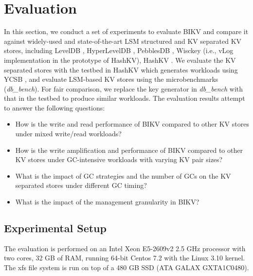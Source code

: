 \documentclass[sigconf]{acmart}
\begin{document}
\section{Evaluation} \label{evaluation}
In this section, we conduct a set of experiments to evaluate BIKV and compare it against widely-used and state-of-the-art LSM structured and KV separated KV stores, including LevelDB \cite{LevelDB}, HyperLevelDB \cite{HyperLevelDB}, PebblesDB \cite{PebblesDB}, Wisckey \cite{Wisckey} (i.e., vLog implementation in the prototype of HashKV), HashKV \cite{HashKV} {}. We evaluate the KV separated stores with the testbed in HashKV which generates workloads using YCSB \cite{YCSB}, and evaluate LSM-based KV stores using the microbenchmarks (\textit{db\_bench}). For fair comparison, we replace the key generator in \textit{db\_bench} with that in the testbed to produce similar workloads. {\color{red}{We also modify the workload generator in KVell to produce the KV pairs under the same distribution with the testbed.}} The evaluation results attempt to answer the following questions:
\begin{itemize}
	\item How is the write and read performance of BIKV compared to other KV stores under mixed write/read workloads?
	\item How is the write amplification and performance of BIKV compared to other KV stores under GC-intensive workloads with varying KV pair sizes?
	\item What is the impact of GC strategies and the number of GCs on the {\color{red}{LSM-indexed}} KV separated stores under different GC timing?  
	\item What is the impact of the management granularity in BIKV?
\end{itemize}

\subsection{Experimental Setup}
The evaluation is performed on an Intel Xeon E5-2609v2 2.5 GHz processor with two cores, 32 GB of RAM, running 64-bit Centos 7.2 with the Linux 3.10 kernel. The xfs file system is run on top of a 480 GB SSD (ATA GALAX GXTA1C0480). 
\end{document}
